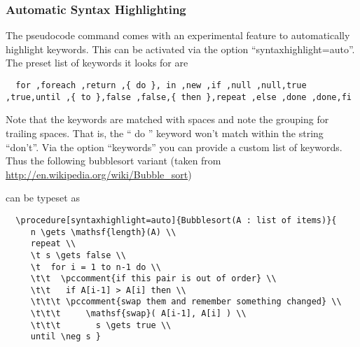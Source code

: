 \documentclass[a4paper]{report}
\begin{document}
  \subsubsection{Automatic Syntax Highlighting}
  The pseudocode command comes with an experimental feature to automatically highlight keywords. This can be activated via
  the option \enquote{syntaxhighlight=auto}. The preset list of keywords it looks for are
  \begin{lstlisting}
  for ,foreach ,return ,{ do }, in ,new ,if ,null ,null,true ,true,until ,{ to },false ,false,{ then },repeat ,else ,done ,done,fi 
  \end{lstlisting}
  Note that the keywords are matched with spaces and note the grouping for trailing spaces. That is, the \enquote{ do } keyword won't match within the string \enquote{don't}.
  Via the option \enquote{keywords} you can provide a custom list of keywords.
  Thus the following bubblesort variant (taken from \url{http://en.wikipedia.org/wiki/Bubble_sort}) 
  \begin{center}
  \end{center}
  can be typeset as
  \begin{lstlisting}
  \procedure[syntaxhighlight=auto]{Bubblesort(A : list of items)}{
	 n \gets \mathsf{length}(A) \\
	 repeat \\
	 \t s \gets false \\
	 \t  for i = 1 to n-1 do \\
	 \t\t  \pccomment{if this pair is out of order} \\
	 \t\t   if A[i-1] > A[i] then \\
	 \t\t\t \pccomment{swap them and remember something changed} \\
	 \t\t\t     \mathsf{swap}( A[i-1], A[i] ) \\
	 \t\t\t       s \gets true \\
	 until \neg s }
  \end{lstlisting}
  
\end{document}
